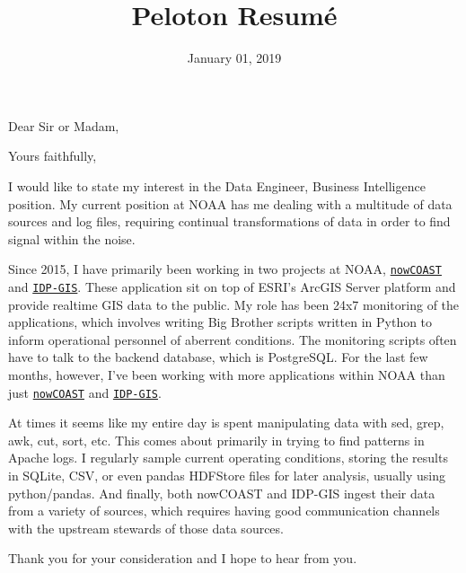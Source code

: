 \documentclass[11pt,a4paper,sans]{moderncv}        %
\title{Peloton Resumé}
\begin{document}
\date{January 01, 2019}
\opening{Dear Sir or Madam,}
\closing{Yours faithfully,}
\makelettertitle

I would like to state my interest in the Data Engineer, Business Intelligence
position.  My current position at NOAA has me dealing with a multitude of
data sources and log files, requiring continual transformations of data in 
order to find signal within the noise. 

Since 2015, I have primarily been working in two projects at NOAA, 
\href{https://nowcoast.noaa.gov}{\texttt{nowCOAST}}
and
\href{https://idpgis.ncep.noaa.gov}{\texttt{IDP-GIS}}.
These application sit on top of ESRI's ArcGIS Server platform and provide
realtime GIS data to the public.  My role has been 24x7 monitoring of the
applications, which involves writing Big Brother scripts written in Python
to inform operational
personnel of aberrent conditions.  The monitoring scripts often have to talk
to the backend database, which is PostgreSQL.
For the last few months, however, I've been working with more applications
within NOAA than just 
\href{https://nowcoast.noaa.gov}{\texttt{nowCOAST}}
and
\href{https://idpgis.ncep.noaa.gov}{\texttt{IDP-GIS}}.

At times it seems like my entire day is spent manipulating data
with sed, grep, awk, cut, sort, etc.  This comes about primarily in trying
to find patterns in Apache logs.  I regularly sample current
operating conditions, storing the results in SQLite, CSV, or even 
pandas HDFStore files
for later analysis, usually using python/pandas.  And finally, both
nowCOAST and IDP-GIS ingest their data from a variety of sources,
which requires having good communication channels with the upstream
stewards of those data sources.

Thank you for your consideration and I hope to hear from you.


\makeletterclosing

\end{document}
